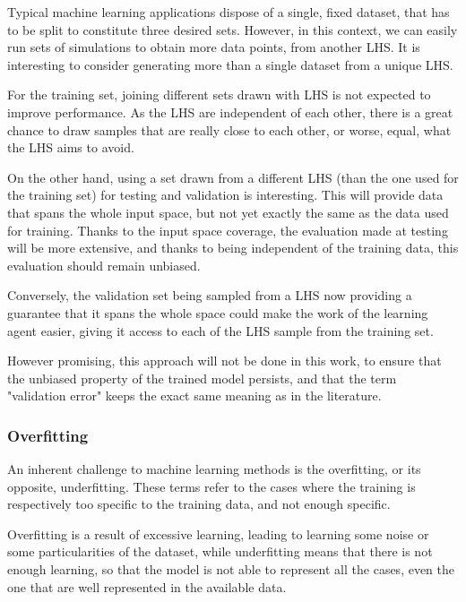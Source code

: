 Typical machine learning applications dispose of a single, fixed dataset, that has to be split to constitute three desired sets. However, in this context, we can easily run sets of simulations to obtain more data points, from another LHS. It is interesting to consider generating more than a single dataset from a unique LHS.

For the training set, joining different sets drawn with LHS is not expected to improve performance. As the LHS are independent of each other, there is a great chance to draw samples that are really close to each other, or worse, equal, what the LHS aims to avoid.

On the other hand, using a set drawn from a different LHS (than the one used for the training set) for testing and validation is interesting. This will provide data that spans the whole input space, but not yet exactly the same as the data used for training. Thanks to the input space coverage, the evaluation made at testing will be more extensive, and thanks to being independent of the training data, this evaluation should remain unbiased. 

Conversely, the validation set being sampled from a LHS now providing a guarantee that it spans the whole space could make the work of the learning agent easier, giving it access to each of the LHS sample from the training set.

However promising, this approach will not be done in this work, to ensure that the unbiased property of the trained model persists, and that the term "validation error" keeps the exact same meaning as in the literature.

\subsubsection{Overfitting}

An inherent challenge to machine learning methods is the overfitting, or its opposite, underfitting. These terms refer to the cases where the training is respectively too specific to the training data, and not enough specific.

Overfitting is a result of excessive learning, leading to learning some noise or some particularities of the dataset, while underfitting means that there is not enough learning, so that the model is not able to represent all the cases, even the one that are well represented in the available data.

